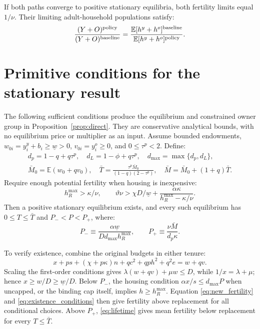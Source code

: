 \documentclass[11pt]{article}
\begin{document}
If both paths converge to positive stationary equilibria, both fertility
limits equal $1/\nu$. Their limiting adult-household populations satisfy:
\begin{equation}
\frac{(Y+O)^{\rm policy}}{(Y+O)^{\rm baseline}}
=\frac{\mathbb E[h^y+h^o]^{\rm baseline}}
{\mathbb E[h^y+h^o]^{\rm policy}}.
\label{eq:population_limit}
\end{equation}
\clearpage
\appendix
\section{Primitive conditions for the stationary result}
\label{app:primitives}

The following sufficient conditions produce the equilibrium and constrained
owner group in Proposition~\ref{prop:direct}. They are conservative analytical
bounds, with no equilibrium price or multiplier as an input. Assume bounded
endowments, $w_{0i}=y_i^y+b_i\ge\underline w>0$, $v_{0i}=y_i^o\ge0$, and
$0\le\tau^p<2$. Define:
\begin{equation}
\begin{gathered}
d_p=1-q+q\tau^p,\quad d_L=1-\phi+q\tau^p,\quad
d_{\max}=\max\{d_p,d_L\},\\
\bar M_0=\mathbb E(w_0+qv_0),\quad
\bar T=\frac{\tau^p\bar M_0}{(1-q)(2-\tau^p)},\quad
\bar M=\bar M_0+(1+q)\bar T.
\end{gathered}
\end{equation}
Require enough potential fertility when housing is inexpensive:
\begin{equation}
h_R^{\max}>\kappa/\nu,\qquad
\vartheta\nu>\chi D/\underline w+
\frac{\alpha\kappa}{h_R^{\max}-\kappa/\nu}.
\label{eq:existence_conditions}
\end{equation}
Then a positive stationary equilibrium exists, and every such equilibrium has
$0\le T\le\bar T$ and $P_-<P<P_+$, where:
\begin{equation}
P_-\equiv\frac{\alpha\underline w}{D d_{\max}h_R^{\max}},
\qquad P_+\equiv\frac{\nu\bar M}{d_p\kappa}.
\label{eq:price_bounds}
\end{equation}

To verify existence, combine the original budgets in either tenure:
\begin{equation}
x+ps+(\chi+p\kappa)n+qc^2+qp h^2+q^2e=w+qv.
\label{eq:lifetime}
\end{equation}
Scaling the first-order conditions gives
$\lambda(w+qv)+\mu w\le D$, while $1/x=\lambda+\mu$; hence
$x\ge w/D\ge\underline w/D$. Below $P_-$, the housing condition
$\alpha x/s\le d_{\max}P$ when uncapped, or the binding cap itself,
implies $h\ge h_R^{\max}$. Equation \eqref{eq:new_fertility} and
\eqref{eq:existence_conditions} then give fertility above replacement for
all conditional choices. Above $P_+$, \eqref{eq:lifetime} gives mean
fertility below replacement for every $T\le\bar T$.
\end{document}
